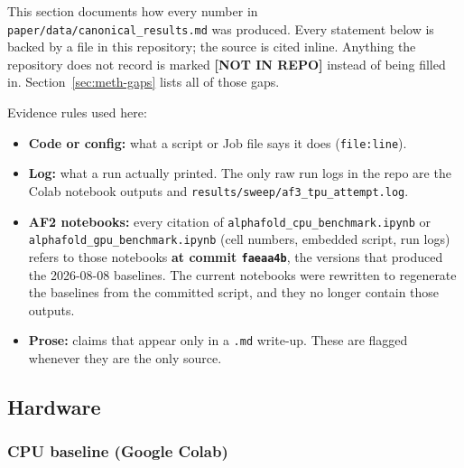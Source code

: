 \providecommand{\TODO}[1]{\textbf{[#1]}}

This section documents how every number in \texttt{paper/\allowbreak{}data/\allowbreak{}canonical\_\allowbreak{}results.md}
was produced. Every statement below is backed by a file in this repository; the
source is cited inline. Anything the repository does not record is marked
\TODO{NOT IN REPO} instead of being filled in. Section~\ref{sec:meth-gaps} lists all of those gaps.

Evidence rules used here:
\begin{itemize}
  \item \textbf{Code or config:} what a script or Job file says it does (\texttt{file:line}).
  \item \textbf{Log:} what a run actually printed. The only raw run logs in the repo are
    the Colab notebook outputs and \texttt{results/\allowbreak{}sweep/\allowbreak{}af3\_\allowbreak{}tpu\_\allowbreak{}attempt.log}.
  \item \textbf{AF2 notebooks:} every citation of \texttt{alphafold\_\allowbreak{}cpu\_\allowbreak{}benchmark.ipynb} or
    \texttt{alphafold\_\allowbreak{}gpu\_\allowbreak{}benchmark.ipynb} (cell numbers, embedded script, run logs) refers to
    those notebooks \textbf{at commit \texttt{faeaa4b}}, the versions that produced the 2026-08-08
    baselines. The current notebooks were rewritten to regenerate the baselines from the
    committed script, and they no longer contain those outputs.
  \item \textbf{Prose:} claims that appear only in a \texttt{.md} write-up. These are flagged
    whenever they are the only source.
\end{itemize}

\subsection{Hardware}
\label{sec:meth-hardware}

\subsubsection{CPU baseline (Google Colab)}
\label{sec:meth-hw-cpu}


